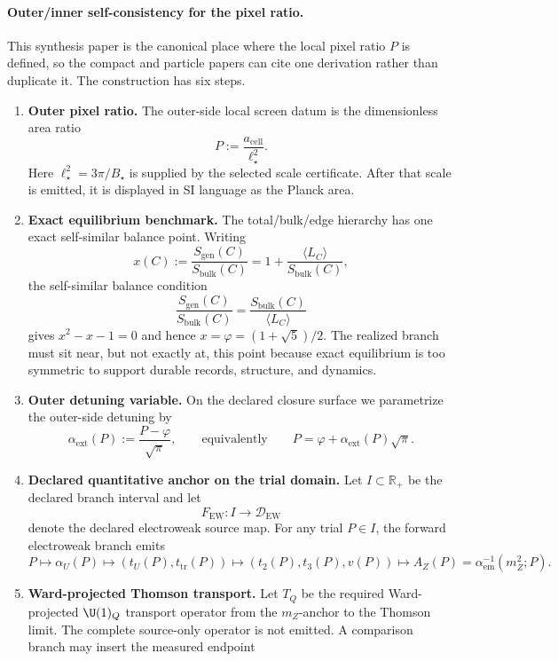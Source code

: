\paragraph{Outer/inner self-consistency for the pixel ratio.}\label{sec:p-closure}
This synthesis paper is the canonical place where the local pixel ratio \(P\) is defined, so the
compact and particle papers can cite one derivation rather than duplicate it. The construction has
six steps.
\begin{enumerate}[leftmargin=2em]
\item \textbf{Outer pixel ratio.} The outer-side local screen datum is the dimensionless area
ratio
\[
P:=\frac{a_{\mathrm{cell}}}{\ell_\star^2}.
\]
Here \(\ell_\star^2=3\pi/B_\star\) is supplied by the selected scale certificate. After that scale
is emitted, it is displayed in SI language as the Planck area.
\item \textbf{Exact equilibrium benchmark.} The total/bulk/edge hierarchy has one exact
self-similar balance point. Writing
\[
x(C):=\frac{S_{\mathrm{gen}}(C)}{S_{\mathrm{bulk}}(C)}
=
1+\frac{\langle L_C\rangle}{S_{\mathrm{bulk}}(C)},
\]
the self-similar balance condition
\[
\frac{S_{\mathrm{gen}}(C)}{S_{\mathrm{bulk}}(C)}
=
\frac{S_{\mathrm{bulk}}(C)}{\langle L_C\rangle}
\]
gives \(x^2-x-1=0\) and hence \(x=\varphi=(1+\sqrt5)/2\). The realized branch must sit near, but
not exactly at, this point because exact equilibrium is too symmetric to support durable records,
structure, and dynamics.
\item \textbf{Outer detuning variable.} On the declared closure surface we parametrize
the outer-side detuning by
\[
\alpha_{\mathrm{ext}}(P):=\frac{P-\varphi}{\sqrt{\pi}},
\qquad\text{equivalently}\qquad
P=\varphi+\alpha_{\mathrm{ext}}(P)\sqrt{\pi}.
\]
\item \textbf{Declared quantitative anchor on the trial domain.} Let \(I\subset\mathbb R_+\) be
the declared branch interval and let
\[
F_{\mathrm{EW}}:I\longrightarrow\mathcal D_{\mathrm{EW}}
\]
denote the declared electroweak source map. For any trial \(P\in I\), the forward electroweak branch emits
\[
P\longmapsto \alpha_U(P)\longmapsto (t_U(P),t_{\mathrm{tr}}(P))
\longmapsto (t_2(P),t_3(P),v(P))
\longmapsto A_Z(P)=\alpha_{\mathrm{em}}^{-1}(m_Z^2;P).
\]
\item \textbf{Ward-projected Thomson transport.} Let \(T_Q\) be the required Ward-projected
\(\U(1)_Q\) transport operator from the \(m_Z\)-anchor to the Thomson limit. The complete
source-only operator is not emitted. A comparison branch may insert the measured endpoint

\end{enumerate}
